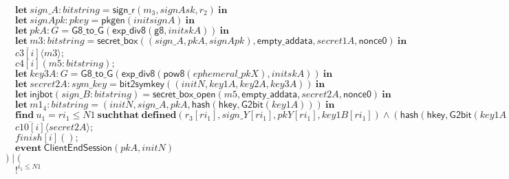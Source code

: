 \documentclass{article}
\newcommand{\cinput}[2]{{#1}({#2})}
\newcommand{\coutput}[2]{\overline{#1}\langle{#2}\rangle}
\newcommand{\kw}[1]{\mathbf{#1}}
\newcommand{\kwf}[1]{\mathsf{#1}}
\newcommand{\var}[1]{\mathit{#1}}
\newcommand{\kwt}[1]{\mathit{#1}}
\newcommand{\kwp}[1]{\mathit{#1}}
\newcommand{\kwc}[1]{\mathit{#1}}
\begin{document}
\begin{tabbing}
\>$\quad \kw{let}\ \var{sign{\_}A}: \kwt{bitstring} = \kwf{sign{\_}r}(\var{m}_{3}, \var{signAsk}, \var{r}_{2})\ \kw{in}$\\
\>$\quad \kw{let}\ \var{signApk}: \kwt{pkey} = \kwf{pkgen}(\var{initsignA})\ \kw{in}$\\
\>$\quad \kw{let}\ \var{pkA}: \kwt{G} = \kwf{G8{\_}to{\_}G}(\kwf{exp{\_}div8}(\kwf{g8}, \var{initskA}))\ \kw{in}$\\
\>$\quad \kw{let}\ \var{m3}: \kwt{bitstring} = \kwf{secret{\_}box}(\kwf{}(\var{sign{\_}A}, \var{pkA}, \var{signApk}), \kwf{empty{\_}addata}, \var{secret1A}, \kwf{nonce0})\ \kw{in}$\\
\>$\quad \coutput{\kwc{c3}[\var{i}]}{\var{m3}};$\\
\>$\quad \cinput{\kwc{c4}[\var{i}]}{\var{m5}: \kwt{bitstring}};$\\
\>$\quad \kw{let}\ \var{key3A}: \kwt{G} = \kwf{G8{\_}to{\_}G}(\kwf{exp{\_}div8}(\kwf{pow8}(\var{ephemeral{\_}pkX}), \var{initskA}))\ \kw{in}$\\
\>$\quad \kw{let}\ \var{secret2A}: \kwt{sym{\_}key} = \kwf{bit2symkey}(\kwf{}(\var{initN}, \var{key1A}, \var{key2A}, \var{key3A}))\ \kw{in}$\\
\>$\quad \kw{let}\ \kwf{injbot}(\var{sign{\_}B}: \kwt{bitstring}) = \kwf{secret{\_}box{\_}open}(\var{m5}, \kwf{empty{\_}addata}, \var{secret2A}, \kwf{nonce0})\ \kw{in}$\\
\>$\quad \kw{let}\ \var{m1}_{4}: \kwt{bitstring} = \kwf{}(\var{initN}, \var{sign{\_}A}, \var{pkA}, \kwf{hash}(\kwf{hkey}, \kwf{G2bit}(\var{key1A})))\ \kw{in}$\\
\>$\quad \kw{find}\ \var{u}_{1} = \var{ri}_{1} \leq \kwp{N1}\ \kw{suchthat}\ \kw{defined}(\var{r}_{3}[\var{ri}_{1}], \var{sign{\_}Y}[\var{ri}_{1}], \var{pkY}[\var{ri}_{1}], \var{key1B}[\var{ri}_{1}])\wedge (\kwf{hash}(\kwf{hkey}, \kwf{G2bit}(\var{key1A}))  =  \kwf{hash}(\kwf{hkey}, \kwf{G2bit}(\var{key1B}[\var{ri}_{1}]))) \wedge  (\var{pkA}  =  \var{pkY}[\var{ri}_{1}]) \wedge  (\var{sign{\_}A}  =  \var{sign{\_}Y}[\var{ri}_{1}]) \wedge  \kwf{check2}(\var{m1}_{4}, \kwf{pkgen2}(\var{initsignB}), \var{sign{\_}B})\ \kw{then}$\\
\>$\quad \coutput{\kwc{c10}[\var{i}]}{\var{secret2A}};$\\
\>$\quad \cinput{\kwc{finish}[\var{i}]}{};$\\
\>$\quad \kw{event}\ \kwf{ClientEndSession}(\var{pkA}, \var{initN})$\\
\>$) \mid ($\\
\>$\quad !^{\var{i}_{1} \leq \kwp{N1}}$\\

\end{tabbing}
\end{document}
